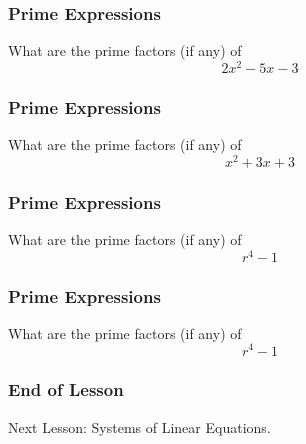 \documentclass[xcolor=dvipsnames]{beamer}
\begin{document}
\begin{frame}
  \frametitle{Prime Expressions}
  What are the prime factors (if any) of
  \begin{equation}
    \label{eq:acoghuze}
    2x^{2}-5x-3
  \end{equation}
\end{frame}

\begin{frame}
  \frametitle{Prime Expressions}
  What are the prime factors (if any) of
  \begin{equation}
    \label{eq:chaitiew}
    x^{2}+3x+3
  \end{equation}
\end{frame}

\begin{frame}
  \frametitle{Prime Expressions}
  What are the prime factors (if any) of
  \begin{equation}
    \label{eq:cheetahb}
    r^{4}-1
  \end{equation}
\end{frame}

\begin{frame}
  \frametitle{Prime Expressions}
  What are the prime factors (if any) of
  \begin{equation}
    \label{eq:feicaloh}
    r^{4}-1
  \end{equation}
\end{frame}

\begin{frame}
  \frametitle{End of Lesson}
Next Lesson: Systems of Linear Equations.
\end{frame}
\end{document}
